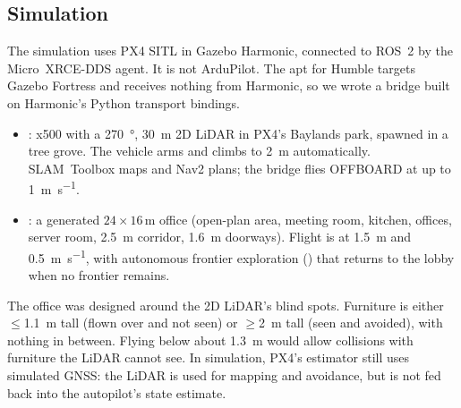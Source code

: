 \subsection{Simulation}
\label{sec:op-sim}

The simulation uses PX4 SITL in Gazebo Harmonic, connected to ROS~2 by the
Micro~XRCE-DDS agent. It is not ArduPilot. The apt  for Humble
targets Gazebo Fortress and receives nothing from Harmonic, so we wrote a
bridge built on Harmonic's Python transport bindings.
\begin{itemize}[leftmargin=*,itemsep=1pt]
  \item {}: x500 with a
    \SI{270}{\degree}, \SI{30}{\metre} 2D LiDAR in PX4's Baylands park, spawned in a tree
    grove. The vehicle arms and climbs to \SI{2}{\metre} automatically. SLAM~Toolbox
    maps and Nav2 plans; the bridge flies OFFBOARD at up to \SI{1}{\metre\per\second}.
  \item {}: a generated
    $24\times16$\,m office (open-plan area, meeting room, kitchen, offices, server
    room, \SI{2.5}{\metre} corridor, \SI{1.6}{\metre} doorways). Flight is at
    \SI{1.5}{\metre} and \SI{0.5}{\metre\per\second}, with autonomous frontier
    exploration \cite{yamauchi1997frontier} () that returns to the
    lobby when no frontier remains.
\end{itemize}
The office was designed around the 2D LiDAR's blind spots. Furniture is either
$\le$\SI{1.1}{\metre} tall (flown over and not seen) or $\ge$\SI{2}{\metre} tall (seen
and avoided), with nothing in between. Flying below about \SI{1.3}{\metre} would allow
collisions with furniture the LiDAR cannot see. In simulation, PX4's estimator still
uses simulated GNSS: the LiDAR is used for mapping and avoidance, but is not fed back
into the autopilot's state estimate.
